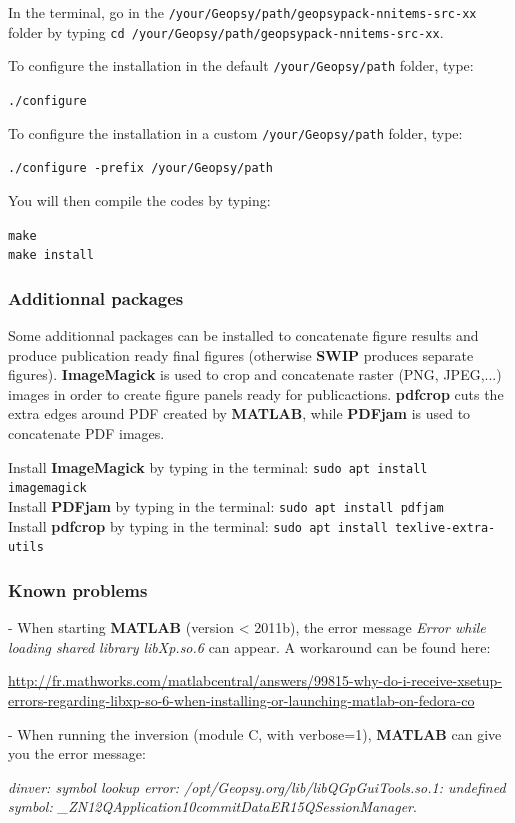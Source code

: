 \documentclass[twoside,a4paper]{article}
\def\SWIP{\textbf{SWIP}}
\def\ImageMagick{\textbf{ImageMagick}}
\def\PDFjam{\textbf{PDFjam}}
\def\pdfcrop{\textbf{pdfcrop}}
\def\MATLAB{\textbf{MATLAB}}
\begin{document}
In the terminal, go in the \verb|/your/Geopsy/path/geopsypack-nnitems-src-xx| folder by typing \verb|cd /your/Geopsy/path/geopsypack-nnitems-src-xx|.

To configure the installation in the default \verb|/your/Geopsy/path| folder, type:

\verb|./configure|

To configure the installation in a custom \verb|/your/Geopsy/path| folder, type:

\verb|./configure -prefix /your/Geopsy/path|

You will then compile the codes by typing:

\verb|make|\\
\verb|make install|


\subsubsection{Additionnal packages}
Some additionnal packages can be installed to concatenate figure results and produce publication ready final figures (otherwise {\SWIP} produces separate figures). {\ImageMagick} is used to crop and concatenate raster (PNG, JPEG,...) images in order to create figure panels ready for publicactions. {\pdfcrop} cuts the extra edges around PDF created by {\MATLAB}, while {\PDFjam} is used to concatenate PDF images.

Install {\ImageMagick} by typing in the terminal: \verb|sudo apt install imagemagick|\\
Install {\PDFjam} by typing in the terminal: \verb|sudo apt install pdfjam|\\
Install {\pdfcrop} by typing in the terminal: \verb|sudo apt install texlive-extra-utils|

\subsubsection{Known problems}
- When starting {\MATLAB} (version < 2011b), the error message \textit{Error while loading shared library libXp.so.6} can appear. A workaround can be found here:

\url{http://fr.mathworks.com/matlabcentral/answers/99815-why-do-i-receive-xsetup-errors-regarding-libxp-so-6-when-installing-or-launching-matlab-on-fedora-co}

- When running the inversion (module C, with verbose=1), {\MATLAB} can give you the error message:

\textit{dinver: symbol lookup error: /opt/Geopsy.org/lib/libQGpGuiTools.so.1: undefined symbol: \_ZN12QApplication10commitDataER15QSessionManager}.
\end{document}
